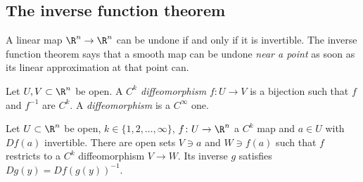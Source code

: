 \subsection*{The inverse function theorem}

A linear map $\R^n\to\R^n$ can be undone if and only if it is invertible. The inverse function theorem says that a smooth map can be undone \emph{near a
point} as soon as its linear approximation at that point can.

\begin{definition}
Let $U,V\subset\R^n$ be open. A \emph{$C^k$ diffeomorphism} $f\colon U\to V$ is a bijection such that $f$ and $f^{-1}$ are $C^k$. A \emph{diffeomorphism}
is a $C^\infty$ one.
\end{definition}

\begin{theorem}\label{thm:inverse}
Let $U\subset\R^n$ be open, $k\in\{1,2,\dots,\infty\}$, $f\colon U\to\R^n$ a $C^k$ map and $a\in U$ with $Df(a)$ invertible. There are open sets $V\ni a$
and $W\ni f(a)$ such that $f$ restricts to a $C^k$ diffeomorphism $V\to W$. Its inverse $g$ satisfies $Dg(y)=Df(g(y))^{-1}$.
\end{theorem}
